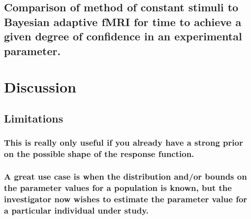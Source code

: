 \documentclass[
  man,floatsintext]{apa6}
\begin{document}
\hypertarget{comparison-of-method-of-constant-stimuli-to-bayesian-adaptive-fmri-for-time-to-achieve-a-given-degree-of-confidence-in-an-experimental-parameter.}{%
\subsection{Comparison of method of constant stimuli to Bayesian adaptive fMRI for time to achieve a given degree of confidence in an experimental parameter.}\label{comparison-of-method-of-constant-stimuli-to-bayesian-adaptive-fmri-for-time-to-achieve-a-given-degree-of-confidence-in-an-experimental-parameter.}}

\hypertarget{discussion}{%
\section{Discussion}\label{discussion}}

\hypertarget{limitations}{%
\subsection{Limitations}\label{limitations}}

\hypertarget{this-is-really-only-useful-if-you-already-have-a-strong-prior-on-the-possible-shape-of-the-response-function.}{%
\subsubsection{This is really only useful if you already have a strong prior on the possible shape of the response function.}\label{this-is-really-only-useful-if-you-already-have-a-strong-prior-on-the-possible-shape-of-the-response-function.}}

\hypertarget{a-great-use-case-is-when-the-distribution-andor-bounds-on-the-parameter-values-for-a-population-is-known-but-the-investigator-now-wishes-to-estimate-the-parameter-value-for-a-particular-individual-under-study.}{%
\subsubsection{A great use case is when the distribution and/or bounds on the parameter values for a population is known, but the investigator now wishes to estimate the parameter value for a particular individual under study.}\label{a-great-use-case-is-when-the-distribution-andor-bounds-on-the-parameter-values-for-a-population-is-known-but-the-investigator-now-wishes-to-estimate-the-parameter-value-for-a-particular-individual-under-study.}}
\end{document}

